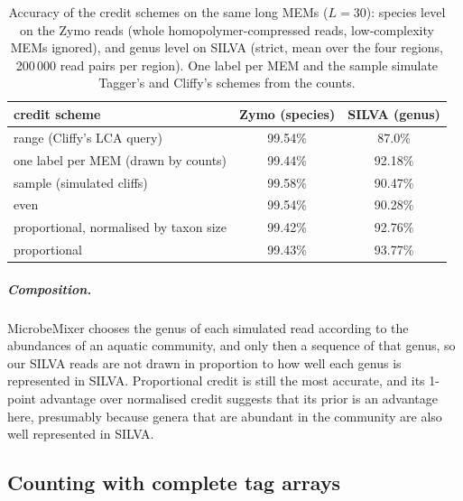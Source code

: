 \begin{table}[t]
\centering
\caption{Accuracy of the credit schemes on the same long MEMs ($L = 30$): species level on the Zymo reads (whole homopolymer-compressed reads, low-complexity MEMs ignored), and genus level on SILVA (strict, mean over the four regions, 200\,000 read pairs per region). One label per MEM and the sample simulate Tagger's and Cliffy's schemes from the counts.}
\label{tab:credit}
\small
\begin{tabular}{lcc}
\toprule
credit scheme & Zymo (species) & SILVA (genus) \\
\midrule
range (Cliffy's LCA query) & 99.54\% & 87.0\% \\
one label per MEM (drawn by counts) & 99.44\% & 92.18\% \\
sample (simulated cliffs) & 99.58\% & 90.47\% \\
even & 99.54\% & 90.28\% \\
proportional, normalised by taxon size & 99.42\% & 92.76\% \\
proportional & 99.43\% & 93.77\% \\
\bottomrule
\end{tabular}
\end{table}

\subparagraph*{Composition.}
MicrobeMixer chooses the genus of each simulated read according to the abundances of an aquatic community, and only then a sequence of that genus, so our SILVA reads are not drawn in proportion to how well each genus is represented in SILVA.
Proportional credit is still the most accurate, and its 1-point advantage over normalised credit suggests that its prior is an advantage here, presumably because genera that are abundant in the community are also well represented in SILVA.

\subsection{Counting with complete tag arrays}
\label{sec:tags}
\label{sec:freq}

